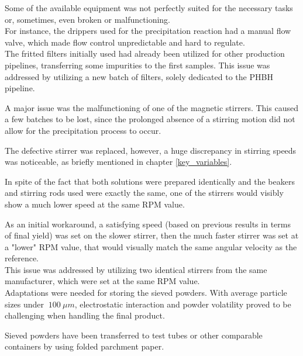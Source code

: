 \documentclass{article}
\begin{document}
        Some of the available equipment was not perfectly suited for the necessary tasks or, sometimes, even broken or malfunctioning. \\ 

        For instance, the drippers used for the precipitation reaction had a manual flow valve, which made flow control unpredictable 
        and hard to regulate. \\ 

        The fritted filters initially used had already been utilized for other production pipelines, transferring some impurities
        to the first samples. This issue was addressed by utilizing a new batch of filters, solely dedicated to the PHBH pipeline. 

        A major issue was the malfunctioning of one of the magnetic stirrers. This caused a few batches to be lost, since the prolonged absence of 
        a stirring motion did not allow for the precipitation process to occur. 

        The defective stirrer was replaced, however, a huge discrepancy 
        in stirring speeds was noticeable, as briefly mentioned in chapter \ref{key_variables}. 

        In spite of the fact that both solutions were prepared identically and the beakers and stirring rods used 
        were exactly the same, one of the stirrers would visibly show a much lower speed at the same RPM value. 

        As an initial workaround, a satisfying speed (based on previous results in terms of final yield) was set on the slower stirrer, 
        then the much faster stirrer was set at a "lower" RPM value, that would visually match the same angular 
        velocity as the reference. \\ 

        This issue was addressed by utilizing two identical stirrers from the same manufacturer, which were set at the same RPM value. \\ 

        Adaptations were needed for storing the sieved powders. With average particle sizes under $ \ 100 \ \mu m$, 
        electrostatic interaction and powder volatility proved to be challenging when handling the final product. 
        
        Sieved powders have been transferred to test tubes or other comparable containers by using folded parchment paper. \\ 
\end{document}
